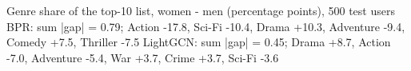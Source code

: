 Genre share of the top-10 list, women - men (percentage points), 500 test users
BPR: sum |gap| = 0.79; Action -17.8, Sci-Fi -10.4, Drama +10.3, Adventure -9.4, Comedy +7.5, Thriller -7.5
LightGCN: sum |gap| = 0.45; Drama +8.7, Action -7.0, Adventure -5.4, War +3.7, Crime +3.7, Sci-Fi -3.6
